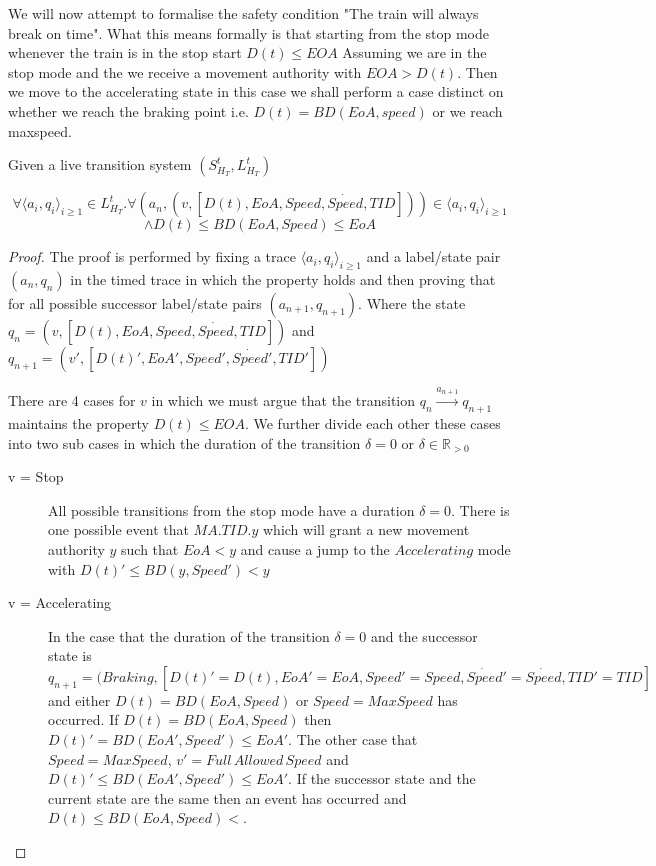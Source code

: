 We will now attempt to formalise the safety condition "The train will always break on time".  What this means formally is that starting from the stop mode whenever the train is in the stop start $D(t) \leq EOA$ Assuming we are in the stop mode and the we receive a movement authority with $EOA > D(t)$. Then we move to the accelerating state in this case we shall perform a case distinct on whether we reach the braking point i.e. $D(t) = BD(EoA, speed)$ or we reach maxspeed.




\begin{mytheorem}
Given a live transition system $(S^t_{H_{T}},  L^{t}_{H_T}) $

 $$\forall \langle a_i, q_i \rangle_{i \geq 1} \in L^{t}_{H_T}.  \forall (a_n, (v, [D(t), EoA,Speed,\dot{Speed},TID])) \in \langle a_i, q_i \rangle_{i \geq 1}$$ $$ \wedge  D(t) \leq BD(EoA,Speed)  \leq EoA$$ 

\begin{proof}


The proof is performed by fixing a trace $ \langle a_i, q_i \rangle_{i \geq 1}$ and  a label/state pair $(a_n, q_n)$ in the timed trace in which the property holds and then proving that for all possible successor label/state pairs $(a_{n+1},q_{n+1})$. Where  the state $q_n = (v, [D(t), EoA,Speed,\dot{Speed},TID])$ and $q_{n+1} = (v', [D(t)', EoA',Speed',\dot{Speed}',TID'])$ 

There are 4 cases for $v$ in which we must argue that the transition $q_n \xrightarrow{a_{n+1}} q_{n+1}$  maintains the property $D(t) \leq EOA$. We further divide each other these cases 
into two sub cases  in which the duration of the transition  $\delta = 0$ or $\delta \in \mathbb{R}_{>0}$



\begin{description}
\item[v = Stop] All possible transitions from the stop mode have a duration $\delta = 0$. There is one possible event that $MA.TID.y$ which will grant a new movement authority $y$ such that $EoA < y$ and cause a jump to the $Accelerating$ mode with $D(t)' \leq BD(y,Speed') < y$


\item[v = Accelerating] In the case that the duration of the transition $\delta = 0$ and the successor state is $q_{n+1} = (Braking,[D(t)' = D(t), EoA' = EoA,Speed' = Speed ,\dot{Speed}' = \dot{Speed},TID' = TID]$ and either $D(t) = BD(EoA,Speed)$ or $Speed = MaxSpeed$ has occurred. If $D(t) = BD(EoA,Speed)$ then $D(t)' = BD(EoA', Speed') \leq EoA'$. The other case that $Speed = MaxSpeed$, $v' = Full \,  Allowed \, Speed$ and $D(t)' \leq BD(EoA', Speed') \leq EoA'$. If the successor state and the current state are the same then an event has occurred and $D(t) \leq BD(EoA,Speed) < $.
  

\end{description}
\end{proof}
\end{mytheorem}
